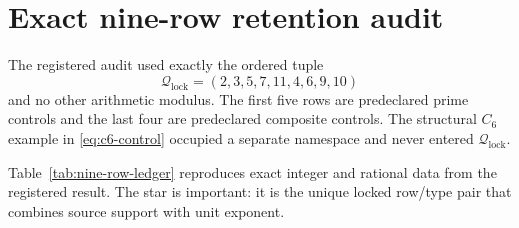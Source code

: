 \documentclass[11pt]{article}
\theoremstyle{definition}
\theoremstyle{remark}
\begin{document}
\section{Exact nine-row retention audit}
\label{sec:audit}

The registered audit used exactly the ordered tuple
\begin{equation}
  \mathcal Q_{\mathrm{lock}}=(2,3,5,7,11,4,6,9,10)
  \label{eq:locked-moduli}
\end{equation}
and no other arithmetic modulus.  The first five rows are predeclared prime
controls and the last four are predeclared composite controls.  The
structural \(C_6\) example in \eqref{eq:c6-control} occupied a separate
namespace and never entered \(\mathcal Q_{\mathrm{lock}}\).

Table~\ref{tab:nine-row-ledger} reproduces exact integer and rational data
from the registered result.  The star is important: it is the unique locked
row/type pair that combines source support with unit exponent.
\end{document}
